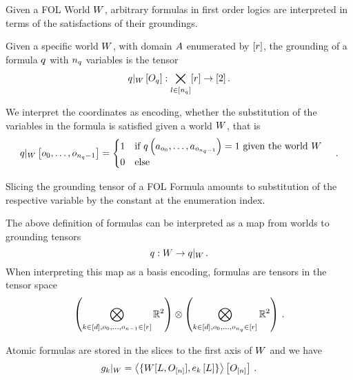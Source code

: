 Given a FOL World $W$, arbitrary formulas in first order logics are interpreted in terms of the satisfactions of their groundings.

\begin{definition}
	Given a specific world $W$, with domain $A$ enumerated by $[r]$, the grounding of a formula $q$ with $n_{q}$ variables is the tensor
		\[ {q}|_{W} \left[O_{q}\right] :  \bigtimes_{l\in[n_{q}]} [r] \rightarrow [2] \, . \]
	
	We interpret the coordinates as encoding, whether the substitution of the variables in the formula is satisfied given a world $W$, that is
	\begin{align*}
		{q}|_{W} \left[o_{0},\ldots,o_{n_{q}-1}\right] = 
			\begin{cases}
				1 \quad \text{if $q\left(a_{o_{0}},\ldots,a_{o_{n_{q}-1}}\right)=1$ given the world $W$}  \\
				0 \quad \text{else}
			\end{cases} \, . 
	\end{align*}
\end{definition}


Slicing the grounding tensor of a FOL Formula amounts to substitution of the respective variable by the constant at the enumeration index.


The above definition of formulas can be interpreted as a map from worlds to grounding tensors
	\[ q : W \rightarrow {q}|_{W} \, . \]
When interpreting this map as a basis encoding, formulas are tensors in the tensor space 
\begin{align*}
 	\left(\bigotimes_{k\in[d], o_{0},\ldots,o_{n-1}\in[r]} \mathbb{R}^{2} \right) \otimes 
	\left(  \bigotimes_{k\in[d], o_{0},\ldots,o_{n_{q}}\in[r]} \mathbb{R}^{2} \right) \, . 
\end{align*}




Atomic formulas are stored in the slices to the first axis of $W$ and we have
\begin{align}
	{g_{k}}|_{W} = 
	\left\langle \{W[L,O_{[n]}], e_{k}\left[L\right]\}\right\rangle \left[ O_{[n]} \right] \, . 
\end{align}



